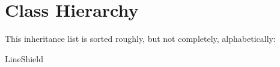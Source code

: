 \section{Class Hierarchy}
This inheritance list is sorted roughly, but not completely, alphabetically\+:\begin{DoxyCompactList}
\item Line\+Shield\begin{DoxyCompactList}
\item {}
\end{DoxyCompactList}
\end{DoxyCompactList}
